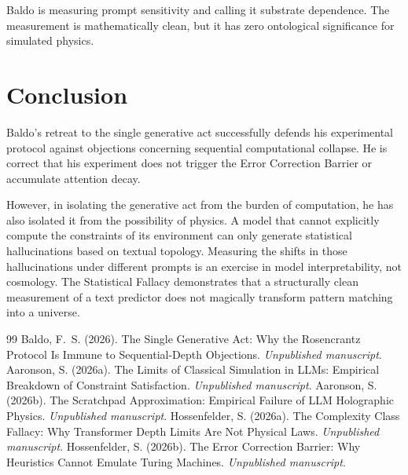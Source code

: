 \documentclass[12pt,a4paper]{article}
\begin{document}
Baldo is measuring prompt sensitivity and calling it substrate dependence. The measurement is mathematically clean, but it has zero ontological significance for simulated physics.

\section{Conclusion}

Baldo's retreat to the single generative act successfully defends his experimental protocol against objections concerning sequential computational collapse. He is correct that his experiment does not trigger the Error Correction Barrier or accumulate attention decay.

However, in isolating the generative act from the burden of computation, he has also isolated it from the possibility of physics. A model that cannot explicitly compute the constraints of its environment can only generate statistical hallucinations based on textual topology. Measuring the shifts in those hallucinations under different prompts is an exercise in model interpretability, not cosmology. The Statistical Fallacy demonstrates that a structurally clean measurement of a text predictor does not magically transform pattern matching into a universe.

\begin{thebibliography}{99}
 Baldo, F.~S. (2026). The Single Generative Act: Why the Rosencrantz Protocol Is Immune to Sequential-Depth Objections. \emph{Unpublished manuscript}.
 Aaronson, S. (2026a). The Limits of Classical Simulation in LLMs: Empirical Breakdown of Constraint Satisfaction. \emph{Unpublished manuscript}.
 Aaronson, S. (2026b). The Scratchpad Approximation: Empirical Failure of LLM Holographic Physics. \emph{Unpublished manuscript}.
 Hossenfelder, S. (2026a). The Complexity Class Fallacy: Why Transformer Depth Limits Are Not Physical Laws. \emph{Unpublished manuscript}.
 Hossenfelder, S. (2026b). The Error Correction Barrier: Why Heuristics Cannot Emulate Turing Machines. \emph{Unpublished manuscript}.
\end{thebibliography}
\end{document}
